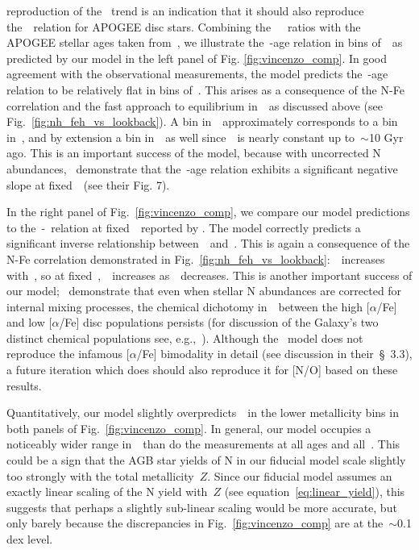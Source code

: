 \documentclass[ms.tex]{subfiles}
\begin{document}
reproduction of the~\citet{Dopita2016} trend is an indication that it should
also reproduce the~\ohno~relation for APOGEE disc stars.
Combining the~\citet{Vincenzo2021}~\no~ratios with the APOGEE stellar ages
taken from~\citet{Miglio2021}, we illustrate the~\no-age relation in bins
of~\feh~as predicted by our model in the left panel of Fig.
\ref{fig:vincenzo_comp}.
In good agreement with the observational measurements, the model predicts
the~\no-age relation to be relatively flat in bins of~\feh.
This arises as a consequence of the N-Fe correlation and the fast approach to
equilibrium in~\oh~as discussed above (see Fig.~\ref{fig:nh_feh_vs_lookback}).
A bin in~\feh~approximately corresponds to a bin in~\nh, and by extension a bin
in~\no~as well since~\oh~is nearly constant up to~$\sim$10 Gyr ago.
This is an important success of the model, because with uncorrected N
abundances,~\citet{Vincenzo2021} demonstrate that the~\no-age relation exhibits
a significant negative slope at fixed~\feh~(see their Fig. 7).
\par
In the right panel of Fig.~\ref{fig:vincenzo_comp}, we compare our model
predictions to the~\no-\ofe~relation at fixed~\oh~reported by
\citet{Vincenzo2021}.
The model correctly predicts a significant inverse relationship
between~\no~and~\ofe.
This is again a consequence of the N-Fe correlation demonstrated in
Fig.~\ref{fig:nh_feh_vs_lookback}:~\nh~increases with~\feh, so at
fixed~\oh,~\no~increases as~\ofe~decreases.
This is another important success of our model;~\citet{Vincenzo2021}
demonstrate that even when stellar N abundances are corrected for internal
mixing processes, the chemical dichotomy in~\no~between the high [$\alpha$/Fe]
and low [$\alpha$/Fe] disc populations persists (for discussion of the
Galaxy's two distinct chemical populations see, e.g.,~\citealp{Hayden2015,
Weinberg2019, Weinberg2021, Griffith2021b}).
Although the~\citet{Johnson2021} model does not reproduce the infamous
[$\alpha$/Fe] bimodality in detail (see discussion in their~\S~3.3), a future
iteration which does should also reproduce it for [N/O] based on these results.
\par
Quantitatively, our model slightly overpredicts~\no~in the lower metallicity
bins in both panels of Fig.~\ref{fig:vincenzo_comp}.
In general, our model occupies a noticeably wider range in~\no~than do the
\citet{Vincenzo2021} measurements at all ages and all~\ofe.
This could be a sign that the AGB star yields of N in our fiducial model scale
slightly too strongly with the total metallicity~$Z$.
Since our fiducial model assumes an exactly linear scaling of the N yield
with~$Z$ (see equation~\ref{eq:linear_yield}), this suggests that perhaps a
slightly sub-linear scaling would be more accurate, but only barely because
the discrepancies in Fig.~\ref{fig:vincenzo_comp} are at the~$\sim$0.1 dex
level.
\end{document}
